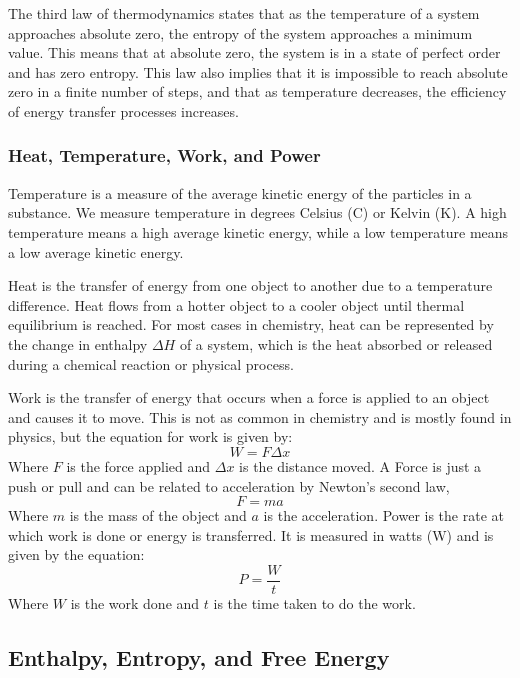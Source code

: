 The third law of thermodynamics states that as the temperature of a system approaches absolute zero, the entropy of the system approaches a minimum value. This means that at absolute zero, the system is in a state of perfect order and has zero entropy. This law also implies that it is impossible to reach absolute zero in a finite number of steps, and that as temperature decreases, the efficiency of energy transfer processes increases.
\subsubsection{Heat, Temperature, Work, and Power}
Temperature is a measure of the average kinetic energy of the particles in a substance. We measure temperature in degrees Celsius (\textdegree C) or Kelvin (K). A high temperature means a high average kinetic energy, while a low temperature means a low average kinetic energy. 

Heat is the transfer of energy from one object to another due to a temperature difference. Heat flows from a hotter object to a cooler object until thermal equilibrium is reached. For most cases in chemistry, heat can be represented by the change in enthalpy $\Delta H$ of a system, which is the heat absorbed or released during a chemical reaction or physical process.

Work is the transfer of energy that occurs when a force is applied to an object and causes it to move. This is not as common in chemistry and is mostly found in physics, but the equation for work is given by:
\begin{equation}\label{eq:work}
    W = F \Delta x
\end{equation}
Where $F$ is the force applied and $\Delta x$ is the distance moved. A Force is just a push or pull and can be related to acceleration by Newton's second law,
\begin{equation}\label{eq:newton}
    F = ma
\end{equation}
Where $m$ is the mass of the object and $a$ is the acceleration. Power is the rate at which work is done or energy is transferred. It is measured in watts (W) and is given by the equation:
\begin{equation}\label{eq:power}
    P = \frac{W}{t}
\end{equation}
Where $W$ is the work done and $t$ is the time taken to do the work. 
\subsection{Enthalpy, Entropy, and Free Energy}
